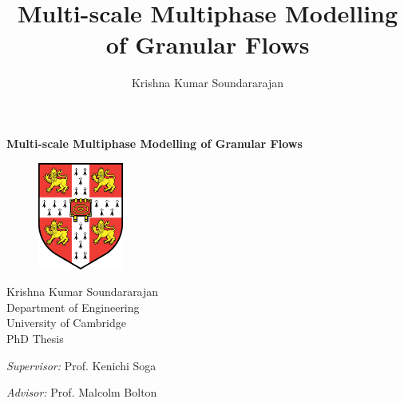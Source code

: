 \documentclass[a4paper,twoside,11pt,fleqn,openright]{book}
\title{Multi-scale Multiphase Modelling of Granular Flows}
\author{Krishna Kumar Soundararajan}
\begin{document}

\begin{singlespace}

\frontmatter

\begin{titlepage}

\begin{center}

\Huge


\textbf{Multi-scale Multiphase Modelling of Granular Flows}

\vspace{1in}

\begin{figure}[ht]
	\centering
		\includegraphics[width=0.25\textwidth]{Cambridge.pdf}
\end{figure}
\vspace{1.2in}
\normalsize

\Large
Krishna Kumar Soundararajan\\

\vspace{0.1in}
\large
Department of Engineering\\
University of Cambridge\\
\vspace{1in}
\large
PhD Thesis\\
\vspace{0.7in}
\begin{minipage}{0.4\textwidth}
\begin{flushleft} \large
\emph{Supervisor:} Prof. Kenichi Soga\\
\end{flushleft}
\end{minipage}
\begin{minipage}{0.4\textwidth}
\begin{flushright} \large
\emph{Advisor:} Prof. Malcolm Bolton\\
\end{flushright}
\end{minipage}


\end{center}
\end{titlepage}
\end{singlespace}
\end{document}
